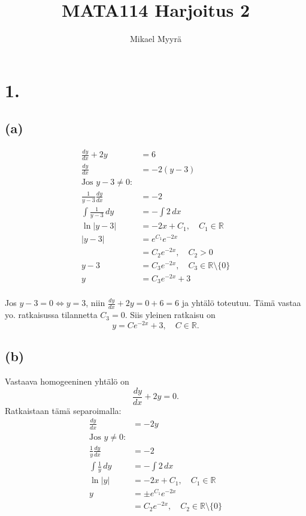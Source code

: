 \documentclass{article}
\title{MATA114 Harjoitus 2}
\author{Mikael Myyrä}
\date{}
\begin{document}
\maketitle

\section*{1.}

\subsection*{(a)}

\begin{align*}
  \frac{dy}{dx} + 2y &= 6 \\
  \frac{dy}{dx} &= -2(y - 3) \\
  \text{Jos $y - 3 \neq 0$}: \\
  \frac{1}{y - 3} \frac{dy}{dx} &= -2 \\
  \int \frac{1}{y - 3} \,dy &= -\int 2 \, dx \\
  \ln |y - 3| &= -2x + C_1, \quad C_1 \in \mathbb{R} \\
  |y - 3| &= e^{C_1} e^{-2x} \\
          &= C_2 e^{-2x}, \quad C_2 > 0 \\
  y - 3 &= C_3 e^{-2x}, \quad C_3 \in \mathbb{R} \setminus \{0\} \\
  y &= C_3 e^{-2x} + 3 \\
\end{align*}

Jos $y - 3 = 0 \iff y = 3$, niin $\frac{dy}{dx} + 2y = 0 + 6 = 6$ ja yhtälö
toteutuu. Tämä vastaa yo. ratkaisussa tilannetta $C_3 = 0$. Siis yleinen
ratkaisu on
\[
  y = Ce^{-2x} + 3, \quad C \in \mathbb{R}.
\]

\subsection*{(b)}

Vastaava homogeeninen yhtälö on
\[
  \frac{dy}{dx} + 2y = 0.
\]
Ratkaistaan tämä separoimalla:
\begin{align*}
  \frac{dy}{dx} &= -2y \\
  \text{Jos $y \neq 0$:} \\
  \frac{1}{y} \frac{dy}{dx} &= -2 \\
  \int \frac{1}{y} \,dy &= -\int 2 \,dx \\
  \ln |y| &= -2x + C_1, \quad C_1 \in \mathbb{R} \\
  y &= \pm e^{C_1} e^{-2x} \\
    &= C_2 e^{-2x}, \quad C_2 \in \mathbb{R} \setminus \{0\} \\
\end{align*}
\end{document}
